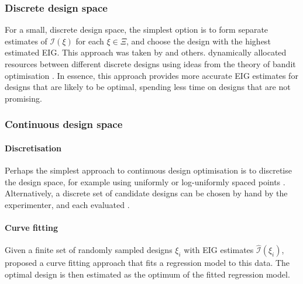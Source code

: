 \documentclass[a4paper, 10pt]{report}
\theoremstyle{plain}
\begin{document}
	
	\subsubsection{Discrete design space}
	For a small, discrete design space, the simplest option is to form separate estimates of $\mathcal{I}(\xi)$ for each $\xi\in\Xi$, and choose the design with the highest estimated EIG.
	This approach was taken by \citet{carlin1998approaches,palmer1998bayesian} and others. %
	\citet{vincent2017} dynamically allocated resources between different discrete designs using ideas from the theory of bandit optimisation \citep{neufeld2014adaptive}. In essence, this approach provides more accurate EIG estimates for designs that are likely to be optimal, spending less time on designs that are not promising.
	
	
	
	\subsubsection{Continuous design space}
	\paragraph{Discretisation}
	Perhaps the simplest approach to continuous design optimisation is to discretise the design space, for example using uniformly or log-uniformly spaced points \citep{ryan2003estimating,van2003optimal,watson2017quest+,vincent2017}.
	Alternatively, a discrete set of candidate designs can be chosen by hand by the experimenter, and each evaluated \citep{han2004bayesian,terejanu2012bayesian,lyu2019ultra}.
	
	
	\paragraph{Curve fitting}
	Given a finite set of randomly sampled designs $\xi_i$ with EIG estimates $\hat{\mathcal{I}}(\xi_i)$, \citet{muller1995optimal} proposed a curve fitting approach that fits a regression model to this data. The optimal design is then estimated as the optimum of the fitted regression model.
	
\end{document}
